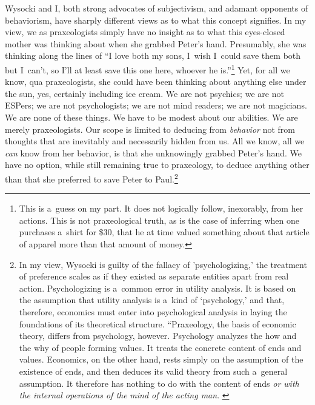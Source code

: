 Wysocki and I, both strong advocates of subjectivism, and adamant opponents of behaviorism, have sharply different views as to what this concept signifies. In my view, we as praxeologists simply have no insight as to what this eyes-closed mother was thinking about when she grabbed Peter's hand. Presumably, she was thinking along the lines of ``I love both my sons, I~wish I~could save them both but I~can't, so I'll at least save this one here, whoever he is.''\footnote{This is a~guess on my part. It does not logically follow, inexorably, from her actions. This is not praxeological truth, as is the case of inferring when one purchases a~shirt for \$30, that he at time valued something about that article of apparel more than that amount of money.} Yet, for all we know, qua praxeologists, she could have been thinking about anything else under the sun, yes, certainly including ice cream. We are not psychics; we are not ESPers; we are not psychologists; we are not mind readers; we are not magicians. We are none of these things. We have to be modest about our abilities. We are merely praxeologists. Our scope is limited to deducing from \textit{behavior} not from thoughts that are inevitably and necessarily hidden from us. All we know, all we \textit{can} know from her behavior, is that she unknowingly grabbed Peter's hand. We have no option, while still remaining true to praxeology, to deduce anything other than that she preferred to save Peter to Paul.\footnote{In my view, Wysocki is guilty of the fallacy of 'psychologizing,' the treatment of preference scales as if they existed as separate entities apart from real action. Psychologizing is a~common error in utility analysis. It is based on the assumption that utility analysis is a~kind of ‘psychology,' and that, therefore, economics must enter into psychological analysis in laying the foundations of its theoretical structure. ``Praxeology, the basis of economic theory, differs from psychology, however. Psychology analyzes the how and the why of people forming values. It treats the concrete content of ends and values. Economics, on the other hand, rests simply on the assumption of the existence of ends, and then deduces its valid theory from such a~general assumption. It therefore has nothing to do with the content of ends \textit{or with the internal operations of the} \textit{mind of the acting man}. 
\parencites[][]{rothbard_toward_2011}[emphasis added by present author,][]{}%
}



